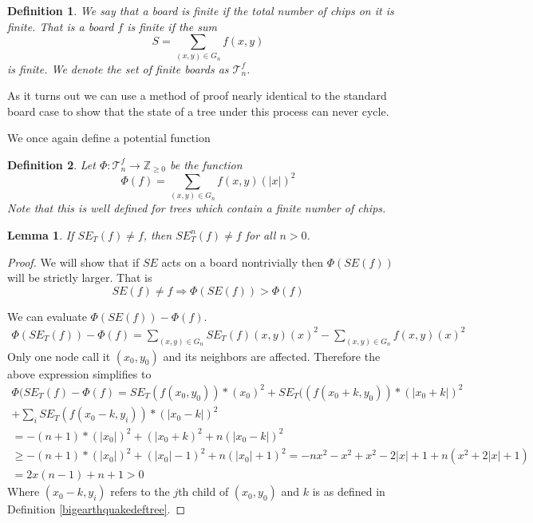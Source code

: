 \documentclass[11pt]{article}
\newtheorem{lemma}{Lemma}
\newtheorem{definition}{Definition}
\begin{document}
\begin{definition} 
We say that a board is finite if the total number of chips on it is finite. That is a board $f$ is finite if the sum
\begin{equation}
S= \sum_{(x,y) \in G_n} f(x,y) 
\end{equation}
is finite. 
We denote the set of finite boards as $\mathcal{T}_n^f$.
\end{definition}

As it turns out we can use a  method of proof nearly identical to the standard board case to show that the state of a tree under this process can never cycle.

We once again define a potential function 
\begin{definition} Let $\Phi: \mathcal{T}_n^f \rightarrow \mathbb{Z}_{\geq 0}$ be the  function
\begin{equation}
\Phi(f) = \sum_{(x,y) \in G_n} f(x,y)(|x|)^2
\end{equation}
Note that this is well defined for trees which contain a finite number of chips. 
\end{definition} 

\begin{lemma}
If $SE_T(f) \neq f$, then $SE_T^n(f) \neq f$ for all $n > 0$.
\end{lemma}

\begin{proof}
We will show that  if $SE$ acts on a board nontrivially then $\Phi(SE(f))$ will be strictly larger. That is  
\begin{equation}
SE(f) \neq f \Rightarrow \Phi(SE(f)) > \Phi(f)
\end{equation}


We can evaluate $\Phi(SE(f)) - \Phi(f)$.
\begin{align}
\Phi(SE_T(f))-\Phi(f) = \sum_{(x,y) \in G_n} SE_T(f)(x,y)(x)^2 - \sum_{(x,y) \in G_n} f(x,y)(x)^2 
\end{align}
Only one node call it $(x_0,y_0)$ and its neighbors are affected. Therefore the above expression simplifies to
\begin{align*}
\Phi(SE_T(f)-\Phi(f) = SE_T( f(x_0,y_0) )* (x_0)^2 + SE_T( (f(x_0+k, y_0) )* (|x_0+k|)^2 \\
+ \sum_{i} SE_T( f(x_0-k, y_i) ) * (|x_0-k|)^2 \\
= -(n+1)*(|x_0|)^2 + (|x_0+k)^2 + n (|x_0-k|)^2 \\
\geq-(n+1)*(|x_0|)^2 + (|x_0|-1)^2 + n (|x_0|+1)^2
= -nx^2-x^2+x^2-2|x|+1+n(x^2+2|x|+1) \\
= 2x(n-1)+n+1 > 0
\end{align*}
Where $(x_0-k,y_i)$ refers to the $j$th child of $(x_0,y_0)$ and $k$ is as defined in Definition \ref{bigearthquakedeftree}.
\end{proof}
\end{document}
